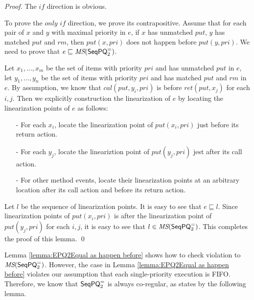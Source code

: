 \begin {proof}

The $\textit{if}$ direction is obvious.

To prove the $\textit{only if}$ direction, we prove its contrapositive. Assume that for each pair of $x$ and $y$ with maximal priority in $e$, if $x$ has unmatched $\textit{put}$, $y$ has matched $\textit{put}$ and $\textit{rm}$, then $\textit{put}(x,\textit{pri})$ does not happen before $\textit{put}(y,\textit{pri})$. We need to prove that $e \sqsubseteq \textit{MS}(\mathsf{SeqPQ}_2^{=})$.

Let $x_1,\ldots,x_m$ be the set of items with priority $\textit{pri}$ and has unmatched $\textit{put}$ in $e$, let $y_1,\ldots,y_n$ be the set of items with priority $\textit{pri}$ and has matched $\textit{put}$ and $\textit{rm}$ in $e$. By assumption, we know that $\textit{cal}(\textit{put},y_i,\textit{pri})$ is before $\textit{ret}(\textit{put},x_j)$ for each $i,j$. Then we explicitly construction the linearization of $e$ by locating the linearization points of $e$ as follows:

\begin{itemize}
\setlength{\itemsep}{0.5pt}
\item[-] For each $x_i$, locate the linearization point of $\textit{put}(x_i,\textit{pri})$ just before its return action.

\item[-] For each $y_j$, locate the lineariztion point of $\textit{put}(y_j,\textit{pri})$ jest after its call action.

\item[-] For other method events, locate their linearization points at an arbitrary location after its call action and before its return action.
\end{itemize}

Let $l$ be the sequence of linearization points. It is easy to see that $e \sqsubseteq l$. Since linearization points of $\textit{put}(x_i,\textit{pri})$ is after the linearization point of $\textit{put}(y_j,\textit{pri})$ for each $i,j$, it is easy to see that $l \in \textit{MS}(\mathsf{SeqPQ}_2^{=})$. This completes the proof of this lemma. \qed
\end {proof}

Lemma \ref{lemma:EPQ2Equal as happen before} shows how to check violation to $\textit{MS}(\mathsf{SeqPQ}_2^{=})$. However, the case in Lemma \ref{lemma:EPQ2Equal as happen before} violates our assumption that each single-priority execution is FIFO. Therefore, we know that $\mathsf{SeqPQ}_2^{=}$ is always co-regular, as states by the following lemma.

